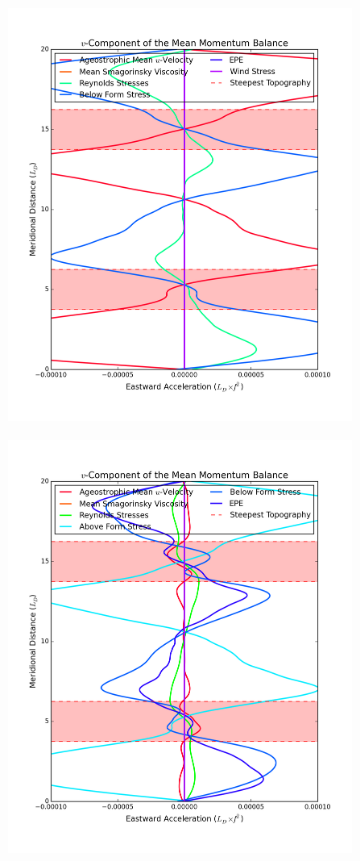 \documentclass[12pt,a4paper]{report}
\begin{document}
 
 \begin{figure}
 	\centering
 	\begin{subfigure}{0.48\linewidth}
 		\centering
 		\caption{}
 		\includegraphics[width=\linewidth ]{vmom_3}
 		\label{fig:vmomlayer3}
 	\end{subfigure}
 	\quad
 	\begin{subfigure}{0.48\linewidth}
 		\centering
 		\caption{}
 		\includegraphics[width=\linewidth ]{vmom_2}

\end{subfigure}
\end{figure}
\end{document}
